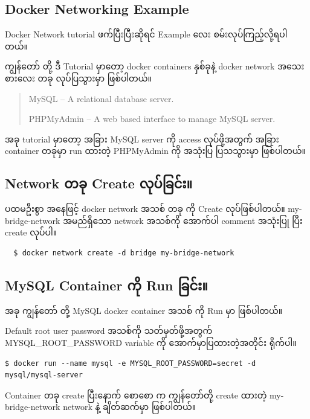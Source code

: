 \documentclass{article}
\begin{document}
\subsection{Docker Networking
Example}\label{docker-networking-example-1}

Docker Network tutorial ဖက်ပြီးပြီးဆိုရင် Example လေး
စမ်းလုပ်ကြည့်လို့ရပါတယ်။

ကျွန်တော် တို့ ဒီ Tutorial မှာတော့ docker containers နှစ်ခုနဲ့ docker
network အသေးစားလေး တခု လုပ်ပြသွားမှာ ဖြစ်ပါတယ်။

\begin{quote}
MySQL -- A relational database server.

PHPMyAdmin -- A web based interface to manage MySQL server.
\end{quote}

အခု tutorial မှာတော့ အခြား MySQL server ကို access လုပ်ဖို့အတွက် အခြား
container တခုမှာ run ထားတဲ့ PHPMyAdmin ကို အသုံးပြ ပြသသွားမှာ ဖြစ်ပါတယ်။

\subsection{Network တခု Create လုပ်ခြင်း။}\label{network--create-}

ပထမဦးစွာ အနေဖြင့် docker network အသစ် တခု ကို Create လုပ်ဖြစ်ပါတယ်။
my-bridge-network အမည်ရှိသော network အသစ်ကို အောက်ပါ comment အသုံးပြု
ပြီး create လုပ်ပါ။

\begin{verbatim}
  $ docker network create -d bridge my-bridge-network
\end{verbatim}

\subsection{MySQL Container ကို Run ခြင်း။}\label{mysql-container--run-}

အခု ကျွန်တော် တို့ MySQL docker container အသစ် ကို Run မှာ ဖြစ်ပါတယ်။

Default root user password အသစ်ကို သတ်မှတ်ဖို့အတွက်
MYSQL\_ROOT\_PASSWORD variable ကို အောက်မှာပြထားတဲ့အတိုင်း ရိုက်ပါ။

\begin{verbatim}
$ docker run --name mysql -e MYSQL_ROOT_PASSWORD=secret -d mysql/mysql-server
\end{verbatim}

Container တခု create ပြီးနောက် စောစော က ကျွန်တော်တို့ create ထားတဲ့
my-bridge-network network နဲ့ ချိတ်ဆက်မှာ ဖြစ်ပါတယ်။
\end{document}

